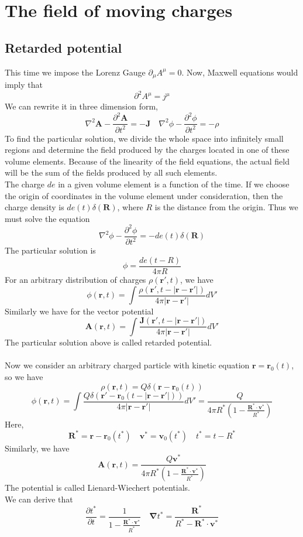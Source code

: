 \documentclass[cyan]{elegantnote}
\begin{document}
\section{The field of moving charges}
\subsection{Retarded potential}
This time we impose the Lorenz Gauge $\partial_{\mu} A^{\mu} = 0$. Now, Maxwell equations would imply that
\[\partial^2 A^{\mu} = j^{\mu}\]
We can rewrite it in three dimension form,
\[\nabla^2 \bm{A} - \frac{\partial^2 \bm{A}}{\partial t^2} = -\bm{J} \quad \nabla^2 \phi - \frac{\partial^2\phi}{\partial t^2} = -\rho\]
To find the particular solution, we divide the whole space into infinitely small regions and determine the field produced by the charges located in one of these volume elements. Because of the linearity of the field equations, the actual field will be the sum of the fields produced by all such elements. \\
The charge $de$ in a given volume element is a function of the time. If we choose the origin of coordinates in the volume element under consideration, then the charge density is $de(t)\delta(\bm{R})$, where $R$ is the distance from the origin. Thus we must solve the equation
\[\nabla^2 \phi - \frac{\partial^2\phi}{\partial t^2} = -de(t)\delta(\bm{R})\]
The particular solution is
\[\phi = \frac{de(t-R)}{4\pi R}\]
For an arbitrary distribution of charges $\rho(\bm{r}',t)$, we have
\[\phi(\bm{r},t) = \int \frac{\rho(\bm{r}',t-|\bm{r}-\bm{r}'|)}{4\pi |\bm{r}-\bm{r}'|} dV'\]
Similarly we have for the vector potential
\[\bm{A}(\bm{r},t) = \int \frac{\bm{J}(\bm{r}',t-|\bm{r}-\bm{r}'|)}{4\pi |\bm{r}-\bm{r}'|} dV'\]
The particular solution above is called retarded potential.\\ 
\\
Now we consider an arbitrary charged particle with kinetic equation $\bm{r} = \bm{r}_0(t)$, so we have
\[\rho(\bm{r},t) = Q\delta(\bm{r}-\bm{r}_0(t))\]
\[\phi(\bm{r},t) = \int \frac{Q \delta (\bm{r}'-\bm{r}_0(t-|\bm{r}-\bm{r}'|))}{4\pi |\bm{r}-\bm{r}'|} dV' = \frac{Q}{4\pi R^* (1 - \frac{\bm{R}^* \cdot \bm{v}^*}{R^*})}\]
Here, 
\[\bm{R}^* = \bm{r} - \bm{r}_0(t^*) \quad \bm{v}^* = \bm{v}_0(t^*) \quad t^* = t - R^*\]
Similarly, we have
\[\bm{A}(\bm{r},t) = \frac{Q\bm{v}^*}{4\pi R^* (1 - \frac{\bm{R}^* \cdot \bm{v}^*}{R^*})}\]
The potential is called Lienard-Wiechert potentials.\\
We can derive that
\[\frac{\partial t^*}{\partial t} = \frac{1}{1- \frac{\bm{R}^* \cdot \bm{v}^*}{R^*}} \quad \bm{\nabla} t^* = \frac{\bm{R}^*}{R^* - \bm{R}^* \cdot \bm{v}^*}\]
\end{document}
